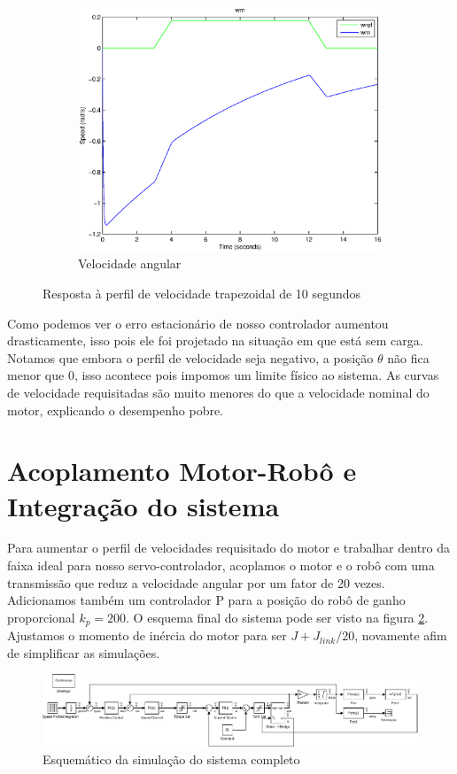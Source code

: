 \documentclass{article}
\begin{document}
\begin{figure}[H]
\begin{subfigure}{0.45\textwidth}
		\includegraphics[width=\linewidth]{matlab/wm9}
		\caption{Velocidade angular}
	\end{subfigure}
	\caption{Resposta à perfil de velocidade trapezoidal de 10 segundos}	
	\label{fig:sim9res}
\end{figure}

Como podemos ver o erro estacionário de nosso controlador aumentou drasticamente, isso pois ele foi projetado na situação em que está sem carga. Notamos que embora o perfil de velocidade seja negativo, a posição $\theta$ não fica menor que $0$, isso acontece pois impomos um limite físico ao sistema. As curvas de velocidade requisitadas são muito menores do que a velocidade nominal do motor, explicando o desempenho pobre.

\section{Acoplamento Motor-Robô e Integração do sistema}
Para aumentar o perfil de velocidades requisitado do motor e trabalhar dentro da faixa ideal para nosso servo-controlador, acoplamos o motor e o robô com uma transmissão que reduz a velocidade angular por um fator de 20 vezes. Adicionamos também um controlador P para a posição do robô de ganho proporcional $k_p = 200$. O esquema final do sistema pode ser visto na figura \ref{fig:sim4}. Ajustamos o momento de inércia do motor para ser $J + J_{link}/20$, novamente afim de simplificar as simulações.

\begin{figure}[H]
	\centering
	\includegraphics[width=\linewidth]{matlab/sim4}
	\caption{Esquemático da simulação do sistema completo}
	\label{fig:sim4}
\end{figure}
\end{document}
